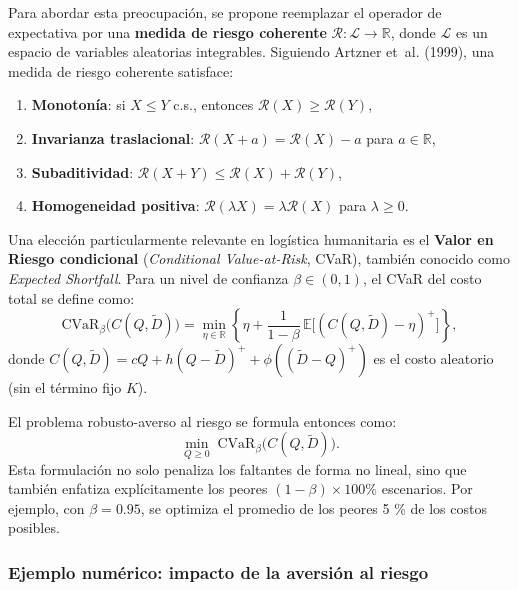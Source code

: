 \documentclass[
  spanish,
  us-letterpaper,
]{scrreprt}
\providecommand{\tightlist}{%
  \setlength{\itemsep}{0pt}\setlength{\parskip}{0pt}}
\numberwithin{equation}{section}
\begin{document}
Para abordar esta preocupación, se propone reemplazar el operador de
expectativa por una \textbf{medida de riesgo coherente}
\(\mathcal{R}: \mathcal{L} \to \mathbb{R}\), donde \(\mathcal{L}\) es un
espacio de variables aleatorias integrables. Siguiendo Artzner et~al.
(1999), una medida de riesgo coherente satisface:

\begin{enumerate}
\def\labelenumi{\arabic{enumi}.}
\tightlist
\item
  \textbf{Monotonía}: si \(X \leq Y\) c.s., entonces
  \(\mathcal{R}(X) \geq \mathcal{R}(Y)\),\\
\item
  \textbf{Invarianza traslacional}:
  \(\mathcal{R}(X + a) = \mathcal{R}(X) - a\) para
  \(a \in \mathbb{R}\),\\
\item
  \textbf{Subaditividad}:
  \(\mathcal{R}(X + Y) \leq \mathcal{R}(X) + \mathcal{R}(Y)\),\\
\item
  \textbf{Homogeneidad positiva}:
  \(\mathcal{R}(\lambda X) = \lambda \mathcal{R}(X)\) para
  \(\lambda \geq 0\).
\end{enumerate}

Una elección particularmente relevante en logística humanitaria es el
\textbf{Valor en Riesgo condicional} (\emph{Conditional Value-at-Risk},
CVaR), también conocido como \emph{Expected Shortfall}. Para un nivel de
confianza \(\beta \in (0,1)\), el CVaR del costo total se define como:
\[
\text{CVaR}_\beta\big( C(Q, \tilde{D}) \big) = \min_{\eta \in \mathbb{R}} \left\{ \eta + \frac{1}{1 - \beta} \, \mathbb{E}\big[ (C(Q, \tilde{D}) - \eta)^+ \big] \right\},
\] donde
\(C(Q, \tilde{D}) = c Q + h (Q - \tilde{D})^+ + \phi((\tilde{D} - Q)^+)\)
es el costo aleatorio (sin el término fijo \(K\)).

El problema robusto-averso al riesgo se formula entonces como: \[
\min_{Q \geq 0} \; \text{CVaR}_\beta \big( C(Q, \tilde{D}) \big).
\] Esta formulación no solo penaliza los faltantes de forma no lineal,
sino que también enfatiza explícitamente los peores
\((1 - \beta) \times 100\%\) escenarios. Por ejemplo, con
\(\beta = 0.95\), se optimiza el promedio de los peores 5 \% de los
costos posibles.

\subsubsection{Ejemplo numérico: impacto de la aversión al
riesgo}\label{ejemplo-numuxe9rico-impacto-de-la-aversiuxf3n-al-riesgo}
\end{document}
